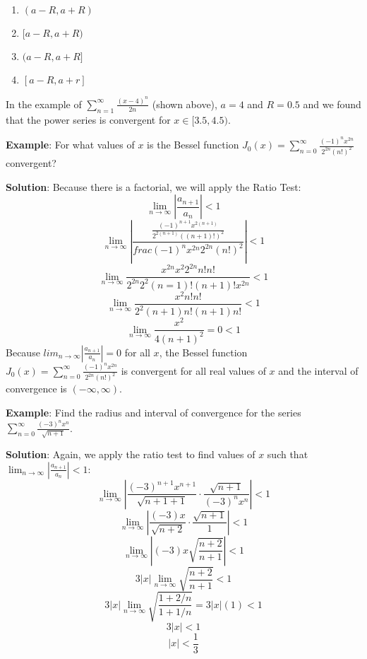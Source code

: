 \begin{enumerate}
\item $(a - R, a + R)$
\item$[a - R, a + R)$
\item$(a - R, a + R]$
\item$[a - R, a + r]$
\end{enumerate}

In the example of $\sum_{n=1}^\infty \frac{(x-4)^n}{2n}$ (shown above), 
$a = 4$ and $R = 0.5$ and we found that the power series is convergent for 
$x \in [3.5, 4.5)$. 

\textbf{Example}: For what values of $x$ is the Bessel function $J_0 (x) = 
\sum_{n=0}^\infty \frac{(-1)^n x^{2n}}{2^{2n}(n!)^2}$ convergent? 

\textbf{Solution}: Because there is a factorial, we will apply the Ratio Test:
$$\lim_{n \to \infty} \left| \frac{a_{n + 1}}{a_n} \right| <  1$$
$$\lim_{n \to \infty} \left| \frac{\frac{(-1)^{n + 1} x^{2(n + 1)}}{2^{2(n + 1
)}((n + 1)!)^2}}{frac{(-1)^n x^{2n}}{2^{2n}(n!)^2}} \right| < 1$$
$$\lim_{n \to \infty} \frac{x^{2n} x^2 2^{2n} n! n!}{2^{2n} 2^2 (n = 1)! (n + 
1)! x^{2n}} < 1$$
$$\lim_{n \to \infty} \frac{x^2 n! n!}{2^2 (n + 1)n! (n + 1)n!} < 1$$
$$\lim_{n \to \infty} \frac{x^2}{4(n + 1)^2} = 0 < 1$$
Because $lim_{n \to \infty} \left| \frac{a_{n + 1}}{a_n} \right| = 0$ for all 
$x$, the Bessel function $J_0 (x) = \sum_{n=0}^\infty \frac{(-1)^n x^{2n}}{2^{
2n}(n!)^2}$ is convergent for all real values of $x$ and the interval of 
convergence is $(-\infty, \infty)$. 

\textbf{Example}: Find the radius and interval of convergence for the series 
$\sum_{n=0}^\infty \frac{(-3)^n x^n}{\sqrt{n + 1}}$.

\textbf{Solution}: Again, we apply the ratio test to find values of $x$ such 
that $\lim_{n \to \infty} \left| \frac{a_{n + 1}}{a_n} \right| < 1$:
$$\lim_{n \to \infty} \left| \frac{(-3)^{n + 1} x^{n + 1}}{\sqrt{n + 1 + 1}} 
\cdot \frac{\sqrt{n + 1}}{(-3)^n x^n} \right| < 1$$
$$\lim_{n \to \infty} \left| \frac{(-3) x}{\sqrt{n + 2}} \cdot \frac{\sqrt{n + 
1}}{1} \right| < 1$$
$$\lim_{n \to \infty} \left| (-3)x \sqrt{\frac{n + 2}{n + 1}} \right| < 1$$
$$3|x| \lim_{n \to \infty} \sqrt{\frac{n + 2}{n + 1}} < 1$$
$$3|x| \lim_{n \to \infty} \sqrt{\frac{1 + 2/n}{1 + 1/n}} = 3|x|(1) < 1$$
$$3|x| < 1$$
$$|x| < \frac{1}{3}$$


